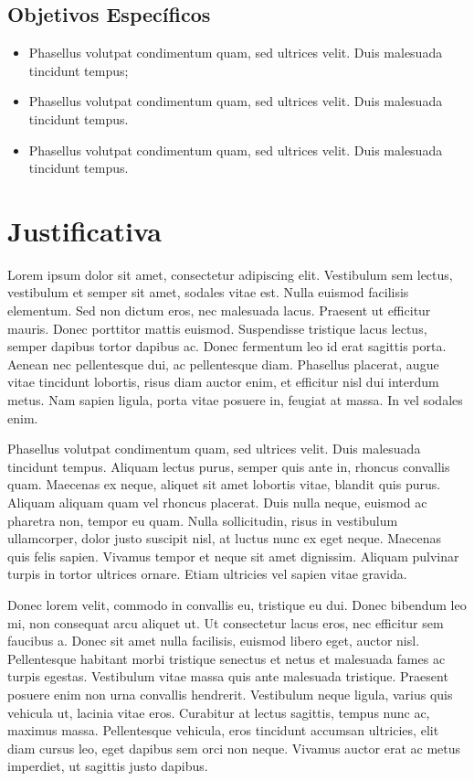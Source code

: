 \subsection{Objetivos Específicos}

\begin{itemize}
\item {Phasellus volutpat condimentum quam, sed ultrices velit. Duis malesuada tincidunt tempus;}
\item{Phasellus volutpat condimentum quam, sed ultrices velit. Duis malesuada tincidunt tempus. }
\item {Phasellus volutpat condimentum quam, sed ultrices velit. Duis malesuada tincidunt tempus. }
\end{itemize}

\section{Justificativa}
Lorem ipsum dolor sit amet, consectetur adipiscing elit. Vestibulum sem lectus, vestibulum et semper sit amet, sodales vitae est. Nulla euismod facilisis elementum. Sed non dictum eros, nec malesuada lacus. Praesent ut efficitur mauris. Donec porttitor mattis euismod. Suspendisse tristique lacus lectus, semper dapibus tortor dapibus ac. Donec fermentum leo id erat sagittis porta. Aenean nec pellentesque dui, ac pellentesque diam. Phasellus placerat, augue vitae tincidunt lobortis, risus diam auctor enim, et efficitur nisl dui interdum metus. Nam sapien ligula, porta vitae posuere in, feugiat at massa. In vel sodales enim.

Phasellus volutpat condimentum quam, sed ultrices velit. Duis malesuada tincidunt tempus. Aliquam lectus purus, semper quis ante in, rhoncus convallis quam. Maecenas ex neque, aliquet sit amet lobortis vitae, blandit quis purus. Aliquam aliquam quam vel rhoncus placerat. Duis nulla neque, euismod ac pharetra non, tempor eu quam. Nulla sollicitudin, risus in vestibulum ullamcorper, dolor justo suscipit nisl, at luctus nunc ex eget neque. Maecenas quis felis sapien. Vivamus tempor et neque sit amet dignissim. Aliquam pulvinar turpis in tortor ultrices ornare. Etiam ultricies vel sapien vitae gravida.

Donec lorem velit, commodo in convallis eu, tristique eu dui. Donec bibendum leo mi, non consequat arcu aliquet ut. Ut consectetur lacus eros, nec efficitur sem faucibus a. Donec sit amet nulla facilisis, euismod libero eget, auctor nisl. Pellentesque habitant morbi tristique senectus et netus et malesuada fames ac turpis egestas. Vestibulum vitae massa quis ante malesuada tristique. Praesent posuere enim non urna convallis hendrerit. Vestibulum neque ligula, varius quis vehicula ut, lacinia vitae eros. Curabitur at lectus sagittis, tempus nunc ac, maximus massa. Pellentesque vehicula, eros tincidunt accumsan ultricies, elit diam cursus leo, eget dapibus sem orci non neque. Vivamus auctor erat ac metus imperdiet, ut sagittis justo dapibus.
